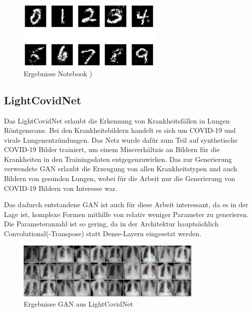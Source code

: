 \begin{figure}[H]
	\centering
	\includegraphics[width=7cm]{kapitel/2_stand_der_technik/img/cgan-notebook-ergebnisse.png}
	\caption{Ergebnisse Notebook \cite{cgan-tutorial-notebook}) }
\end{figure}

\subsection{LightCovidNet}
Das LightCovidNet \cite{inspiration-dc-gan-med} erlaubt die Erkennung von Krankheitsfällen in Lungen Röntgenscans.
Bei den Krankheitsbildern handelt es sich um COVID-19 und virale Lungenentzündungen.
Das Netz wurde dafür zum Teil auf synthetische COVID-19 Bilder trainiert, um einem Missverhältnis an Bildern für die Krankheiten in den Trainingsdaten entgegenzuwirken.
Das zur Generierung verwendete GAN erlaubt die Erzeugung von allen Krankheitstypen und auch Bildern von gesunden Lungen, wobei für die Arbeit nur die Generierung von COVID-19 Bildern von Interesse war.
\newline

Das dadurch entstandene GAN ist auch für diese Arbeit interessant, da es in der Lage ist, komplexe Formen mithilfe von relativ weniger Parameter zu generieren.
Die Parameteranzahl ist so gering, da in der Architektur hauptsächlich Convolutional(-Transpose) statt Dense-Layern eingesetzt werden.

\begin{figure}[H]
	\centering
	\includegraphics[width=9cm]{kapitel/2_stand_der_technik/img/light-covid-net-ergebnisse.png}
	\caption{Ergebnisse GAN aus LightCovidNet \cite{inspiration-dc-gan-med}}
\end{figure}


